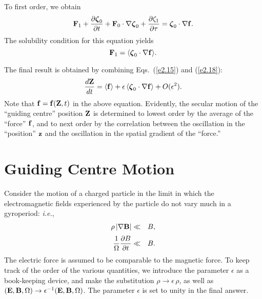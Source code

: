 To first order, we obtain
\begin{equation}
{\bf F}_1 +\frac{\partial\mbox{\boldmath$\zeta$}_0}{\partial t} +
{\bf F}_0\cdot \nabla \mbox{\boldmath$\zeta$}_0 + \frac{\partial\zeta_1}{\partial\tau}
 = \mbox{\boldmath$\zeta$}_0\cdot
 \nabla {\bf f}.
\end{equation}
The solubility condition for this equation yields
\begin{equation}\label{e2.18}
{\bf F}_1 =\langle \mbox{\boldmath$\zeta$}_0\cdot\nabla{\bf f}\rangle.
\end{equation}

The final result is obtained by combining Eqs.~(\ref{e2.15}) and (\ref{e2.18}):
\begin{equation}
\frac{d{\bf Z}}{dt} = \langle {\bf f}\rangle + \epsilon\, \langle \mbox{\boldmath$\zeta$}_0\cdot
\nabla {\bf f}\rangle + O(\epsilon^2).
\end{equation}
Note that ${\bf f} = {\bf f}({\bf Z},t)$ in the above equation. 
Evidently, the secular motion of the ``guiding centre'' position ${\bf Z}$ 
is determined to lowest order by the average of the  ``force'' ${\bf f}$, and to
next order by the correlation between the oscillation in the ``position''
${\bf z}$ and the
oscillation in the spatial gradient of the ``force.'' 

\section{Guiding Centre Motion}
Consider the motion of a charged particle in the limit in which
the electromagnetic fields experienced
by the  particle do not vary much in a gyroperiod: {\em i.e.}, 
\begin{eqnarray}
\rho\,|\nabla{\bf B}| &\ll & B, \\[0.5ex]
\frac{1}{{\Omega}}\frac{\partial B}{\partial t} & \ll & B.
\end{eqnarray}
The electric force is assumed to be comparable to the magnetic force. 
To keep track of the order of the various quantities, we introduce the parameter
$\epsilon$ as a book-keeping device, and make the substitution
$\rho\rightarrow \epsilon\,\rho$, as well as $({\bf E}, {\bf B}, {\Omega})
\rightarrow \epsilon^{-1}({\bf E}, {\bf B}, {\Omega})$. The parameter
$\epsilon$ is set to unity in the final answer.


